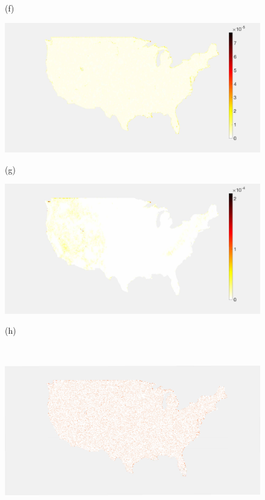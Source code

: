 \documentclass[journal, 10pt]{IEEEtran}
\begin{document}
\begin{figure}[tb]
\begin{minipage}[m]{0.24\linewidth}
\centerline{\small{(f)}}
\end{minipage} %
\begin{minipage}[m]{0.24\linewidth}
\centerline{\includegraphics[width=.85\linewidth]{fig_temp_sampling2}}
\centerline{\small{(g)}}
\end{minipage}
\begin{minipage}[m]{0.24\linewidth}
\centerline{\includegraphics[width=.84\linewidth]{fig_temp_sampling2_adapted}}
\centerline{\small{(h)}}
\end{minipage} \medskip  \\
\begin{minipage}[m]{0.24\linewidth}
\centerline{\includegraphics[width=.84\linewidth]{fig_temp_selected_b2}}

\end{minipage}
\end{figure}
\end{document}
